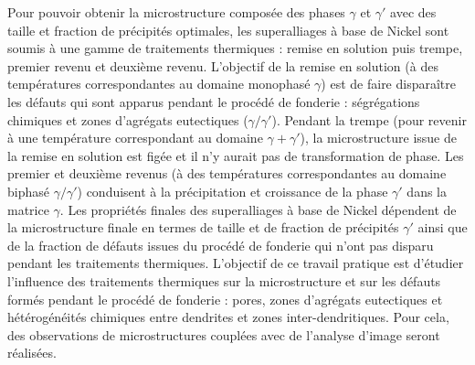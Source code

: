 Pour pouvoir obtenir la microstructure composée des phases $\gamma$ et $\gamma'$ avec des taille et fraction de précipités optimales, les superalliages à base de Nickel sont soumis à une gamme de traitements thermiques : remise en solution puis trempe, premier revenu et deuxième revenu. L’objectif de la remise en solution (à des températures correspondantes au domaine monophasé $\gamma$) est de faire disparaître les défauts qui sont apparus pendant le procédé de fonderie : ségrégations chimiques et zones d’agrégats eutectiques ($\gamma / \gamma'$). Pendant la trempe (pour revenir à une température correspondant au domaine $\gamma + \gamma'$), la microstructure issue de la remise en solution est figée et il n’y aurait pas de transformation de phase. Les premier et deuxième revenus (à des températures correspondantes au domaine biphasé $\gamma / \gamma'$) conduisent à la précipitation et croissance de la phase $\gamma'$ dans la matrice $\gamma$. Les propriétés finales des superalliages à base de Nickel dépendent de la microstructure finale en termes de taille et de fraction de précipités $\gamma'$ ainsi que de la fraction de défauts issues du procédé de fonderie qui n’ont pas disparu pendant les traitements thermiques.
L’objectif de ce travail pratique est d’étudier l’influence des traitements thermiques sur la microstructure et sur les défauts formés pendant le procédé de fonderie : pores, zones d’agrégats eutectiques et hétérogénéités chimiques entre dendrites et zones inter-dendritiques. Pour cela, des observations de microstructures couplées avec de l’analyse d’image seront réalisées.
